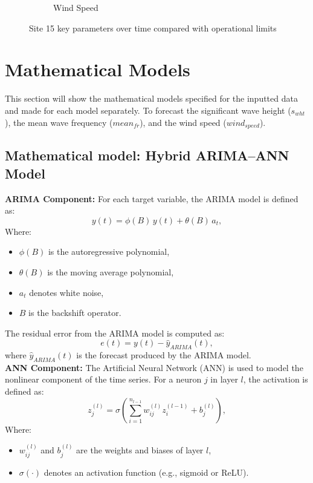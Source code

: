 \begin{figure}[h!]
\begin{subfigure}[b]{0.47\textwidth}
        \caption{Wind Speed}
        \label{fig:wind_speed_15}
    \end{subfigure}
    \caption{Site 15 key parameters over time compared with operational limits}
    \label{fig:site15_limits}
\end{figure}

\newpage

\section{Mathematical Models}
\label{mathematical models}
This section will show the mathematical models specified for the inputted data and made for each model separately. To forecast the significant wave height ($s_{wht}$), the mean wave frequency ($mean_{fr}$), and the wind speed ($wind_{speed}$). 

\subsection{Mathematical model: Hybrid ARIMA–ANN Model}
\label{math:hybrid}
\noindent \textbf{ARIMA Component:}  
For each target variable, the ARIMA model is defined as:
\begin{equation}
    y(t) = \phi(B) \, y(t) + \theta(B) \, a_t,
    \label{eq:arima_generic}
\end{equation}
Where:
\begin{itemize}
    \item \(\phi(B)\) is the autoregressive polynomial,
    \item \(\theta(B)\) is the moving average polynomial,
    \item \(a_t\) denotes white noise,
    \item \(B\) is the backshift operator.
\end{itemize}

\noindent The residual error from the ARIMA model is computed as:
\begin{equation}
    e(t) = y(t) - \hat{y}_{ARIMA}(t),
    \label{eq:residual_error2}
\end{equation}
where \(\hat{y}_{ARIMA}(t)\) is the forecast produced by the ARIMA model.\\

\noindent \textbf{ANN Component:}  
The Artificial Neural Network (ANN) is used to model the nonlinear component of the time series. For a neuron \(j\) in layer \(l\), the activation is defined as:
\begin{equation}
    z^{(l)}_j = \sigma\left(\sum_{i=1}^{n_{l-1}} w_{ij}^{(l)} z_i^{(l-1)} + b_j^{(l)}\right),
    \label{eq:activation_function}
\end{equation}
Where:
\begin{itemize}
    \item \(w_{ij}^{(l)}\) and \(b_j^{(l)}\) are the weights and biases of layer \(l\),
    \item \(\sigma(\cdot)\) denotes an activation function (e.g., sigmoid or ReLU).
\end{itemize}

